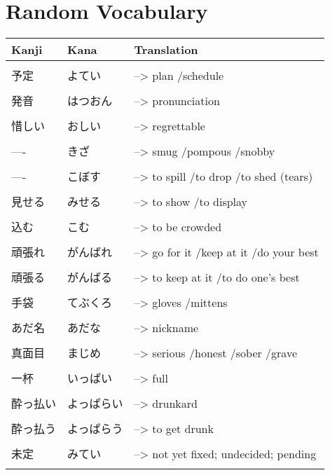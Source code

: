 \documentclass{article}
\begin{document}
\part*{Random Vocabulary}
\begin{tabular}{ l | l p{14cm} }
Kanji&Kana&Translation\\ \hline\\[-1em]
予定 &よてい &--> plan /schedule \\ \hline\\[-1em]
発音 & はつおん	&--> pronunciation 	\\ \hline\\[-1em]
惜しい &おしい &--> regrettable 							\\ \hline\\[-1em]
---- &きざ &--> smug /pompous /snobby					\\ \hline\\[-1em]
---- &こぼす &--> to spill /to drop /to shed (tears)		\\ \hline\\[-1em]
見せる &みせる &--> to show /to display					\\ \hline\\[-1em]
込む &こむ &--> to be crowded							\\ \hline\\[-1em]
頑張れ &がんばれ &--> go for it /keep at it /do your best	\\ \hline\\[-1em]
頑張る &がんばる &--> to keep at it /to do one's best		\\ \hline\\[-1em]
手袋 &てぶくろ &--> gloves /mittens						\\ \hline\\[-1em]
あだ名 &あだな &--> nickname								\\ \hline\\[-1em]
真面目 &まじめ &--> serious /honest /sober /grave			\\ \hline\\[-1em]
一杯 &いっぱい &--> full									\\ \hline\\[-1em]
酔っ払い &よっぱらい &--> drunkard								\\ \hline\\[-1em]
酔っ払う &よっぱらう &--> to get drunk						\\ \hline\\[-1em]
未定 &みてい &--> not yet fixed; undecided; pending		\\ \hline\\[-1em]

\end{tabular}
\end{document}
